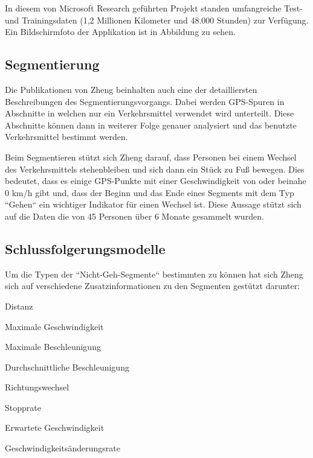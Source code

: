In diesem von Microsoft Research geführten Projekt standen umfangreiche Test- und Trainingsdaten (1,2 Millionen Kilometer und 48.000 Stunden) zur Verfügung. \cite{microsoft_research_geolife_2015} Ein Bildschirmfoto der Applikation ist in Abbildung  zu sehen. 


\subsection{Segmentierung}
Die Publikationen von Zheng beinhalten auch eine der detailliersten Beschreibungen des Segmentierungsvorgangs. Dabei werden GPS-Spuren in Abschnitte in welchen nur ein Verkehrsmittel verwendet wird unterteilt. Diese Abschnitte können dann in weiterer Folge genauer analysiert und das benutzte Verkehrsmittel bestimmt werden.

Beim Segmentieren stützt sich Zheng darauf, dass Personen bei einem Wechsel des Verkehrsmittels stehenbleiben und sich dann ein Stück zu Fuß bewegen. Dies bedeutet, dass es einige GPS-Punkte mit einer Geschwindigkeit von oder beinahe 0 km/h gibt und, dass der Beginn und das Ende eines Segments mit dem Typ ``Gehen`` ein wichtiger Indikator für einen Wechsel ist. Diese Aussage stützt sich auf die Daten die von 45 Personen über 6 Monate gesammelt wurden.

\subsection{Schlussfolgerungsmodelle} \label{schlussfolgerungsmodelle}
Um die Typen der ``Nicht-Geh-Segmente`` bestimmten zu können hat sich Zheng sich auf verschiedene Zusatzinformationen zu den Segmenten gestützt darunter:

\begin{pitemize}
\item Distanz
\item Maximale Geschwindigkeit
\item Maximale Beschleunigung
\item Durchschnittliche Beschleunigung
\item Richtungswechsel
\item Stopprate
\item Erwartete Geschwindigkeit
\item Geschwindigkeitsänderungsrate
\end{pitemize}


